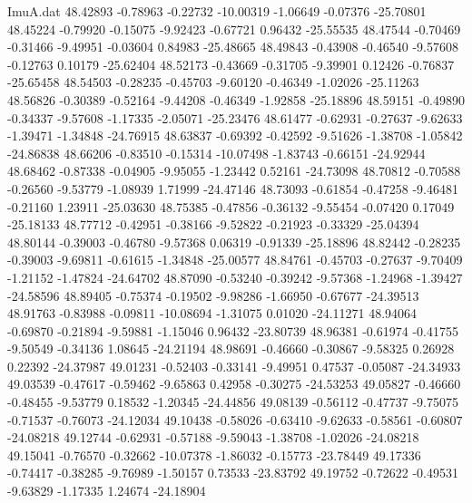 \begin{filecontents}{ImuA.dat}
  48.42893   -0.78963   -0.22732  -10.00319   -1.06649   -0.07376  -25.70801
  48.45224   -0.79920   -0.15075   -9.92423   -0.67721    0.96432  -25.55535
  48.47544   -0.70469   -0.31466   -9.49951   -0.03604    0.84983  -25.48665
  48.49843   -0.43908   -0.46540   -9.57608   -0.12763    0.10179  -25.62404
  48.52173   -0.43669   -0.31705   -9.39901    0.12426   -0.76837  -25.65458
  48.54503   -0.28235   -0.45703   -9.60120   -0.46349   -1.02026  -25.11263
  48.56826   -0.30389   -0.52164   -9.44208   -0.46349   -1.92858  -25.18896
  48.59151   -0.49890   -0.34337   -9.57608   -1.17335   -2.05071  -25.23476
  48.61477   -0.62931   -0.27637   -9.62633   -1.39471   -1.34848  -24.76915
  48.63837   -0.69392   -0.42592   -9.51626   -1.38708   -1.05842  -24.86838
  48.66206   -0.83510   -0.15314  -10.07498   -1.83743   -0.66151  -24.92944
  48.68462   -0.87338   -0.04905   -9.95055   -1.23442    0.52161  -24.73098
  48.70812   -0.70588   -0.26560   -9.53779   -1.08939    1.71999  -24.47146
  48.73093   -0.61854   -0.47258   -9.46481   -0.21160    1.23911  -25.03630
  48.75385   -0.47856   -0.36132   -9.55454   -0.07420    0.17049  -25.18133
  48.77712   -0.42951   -0.38166   -9.52822   -0.21923   -0.33329  -25.04394
  48.80144   -0.39003   -0.46780   -9.57368    0.06319   -0.91339  -25.18896
  48.82442   -0.28235   -0.39003   -9.69811   -0.61615   -1.34848  -25.00577
  48.84761   -0.45703   -0.27637   -9.70409   -1.21152   -1.47824  -24.64702
  48.87090   -0.53240   -0.39242   -9.57368   -1.24968   -1.39427  -24.58596
  48.89405   -0.75374   -0.19502   -9.98286   -1.66950   -0.67677  -24.39513
  48.91763   -0.83988   -0.09811  -10.08694   -1.31075    0.01020  -24.11271
  48.94064   -0.69870   -0.21894   -9.59881   -1.15046    0.96432  -23.80739
  48.96381   -0.61974   -0.41755   -9.50549   -0.34136    1.08645  -24.21194
  48.98691   -0.46660   -0.30867   -9.58325    0.26928    0.22392  -24.37987
  49.01231   -0.52403   -0.33141   -9.49951    0.47537   -0.05087  -24.34933
  49.03539   -0.47617   -0.59462   -9.65863    0.42958   -0.30275  -24.53253
  49.05827   -0.46660   -0.48455   -9.53779    0.18532   -1.20345  -24.44856
  49.08139   -0.56112   -0.47737   -9.75075   -0.71537   -0.76073  -24.12034
  49.10438   -0.58026   -0.63410   -9.62633   -0.58561   -0.60807  -24.08218
  49.12744   -0.62931   -0.57188   -9.59043   -1.38708   -1.02026  -24.08218
  49.15041   -0.76570   -0.32662  -10.07378   -1.86032   -0.15773  -23.78449
  49.17336   -0.74417   -0.38285   -9.76989   -1.50157    0.73533  -23.83792
  49.19752   -0.72622   -0.49531   -9.63829   -1.17335    1.24674  -24.18904

\end{filecontents}
